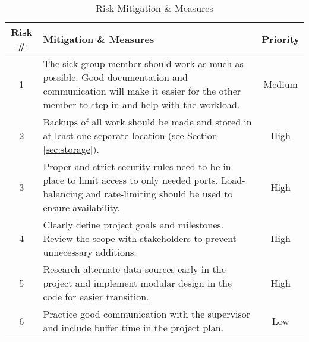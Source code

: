 \begin{table}[H]
    \centering
    \begin{tabularx}{\textwidth}{|c|>{\centering\arraybackslash}X|c|}
    \hline
    \textbf{Risk \#} & \textbf{Mitigation \& Measures} & \textbf{Priority} \\
    \hline
    1 & The sick group member should work as much as possible. Good documentation and communication will make it easier for the other member to step in and help with the workload. & Medium \cellcolor[HTML]{fff000} \\
    \hline
    2 & Backups of all work should be made and stored in at least one separate location (see \hyperref[sec:storage]{Section \ref*{sec:storage}}). & High \cellcolor[HTML]{ff4233} \\
    \hline
    3 & Proper and strict security rules need to be in place to limit access to only needed ports. Load-balancing and rate-limiting should be used to ensure availability. & High \cellcolor[HTML]{ff4233} \\
    \hline
    4 & Clearly define project goals and milestones. Review the scope with stakeholders to prevent unnecessary additions. & High \cellcolor[HTML]{ff4233} \\
    \hline
    5 & Research alternate data sources early in the project and implement modular design in the code for easier transition. & High \cellcolor[HTML]{ff4233} \\
    \hline
    6 & Practice good communication with the supervisor and include buffer time in the project plan. & Low \cellcolor[HTML]{74ff00} \\
    \hline
    \end{tabularx}
    \caption{Risk Mitigation \& Measures}
    \label{tab:risk_mitigation}
\end{table}

\newpage
